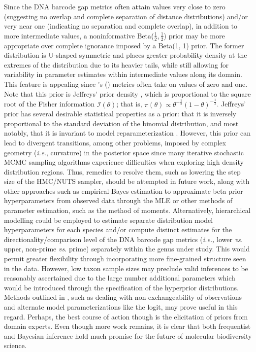 \documentclass[12pt]{article}
\begin{document}
Since the DNA barcode gap metrics often attain values very close to zero (suggesting no overlap and complete separation of distance distributions) and/or very near one (indicating no separation and complete overlap), in addition to more intermediate values, a noninformative Beta($\frac{1}{2}, \frac{1}{2}$) prior may be more appropriate over complete ignorance imposed by a Beta(1, 1) prior. The former distribution is U-shaped symmetric and places greater probability density at the extremes of the distribution due to its heavier tails, while still allowing for variability in parameter estimates within intermediate values along its domain. This feature is appealing since \citeauthor{phillips2024measure}'s (\citeyear{phillips2024measure}) metrics often take on values of zero and one. Note that this prior is Jeffreys' prior density \citep{jeffreys1946invariant}, which is  proportional to the square root of the Fisher information $\mathcal{I}(\theta)$; that is,
$\pi(\theta) \propto \theta^{-\frac{1}{2}}(1-\theta)^{-\frac{1}{2}}$. Jeffreys' prior has several desirable statistical  properties as a prior: that it is inversely proportional to the standard deviation of the binomial distribution, and most notably, that it is invariant to model reparameterization \citep{gelman2014bayesian}. However, this prior can lead to divergent transitions, among other problems, imposed by complex geometry (\textit{i.e.}, curvature) in the posterior space since many iterative stochastic MCMC sampling algorithms experience difficulties when exploring high density distribution regions. Thus, remedies to resolve them, such as lowering the step size of the HMC/NUTS sampler, should be attempted in future work, along with other approaches such as empirical Bayes estimation to approximate beta prior hyperparameters from observed data through the MLE or other methods of parameter estimation, such as the method of moments. Alternatively, hierarchical modelling could be employed to estimate separate distribution model hyperparameters for each species and/or compute distinct estimates for the directionality/comparison level of the DNA barcode gap metrics (\textit{i.e.,} lower \textit{vs.} upper, non-prime \textit{vs.} prime) separately within the genus under study. This would permit greater flexibility through incorporating more fine-grained structure seen in the data. However, low taxon sample sizes may preclude valid inferences to be reasonably ascertained due to the large number additional parameters which would be introduced through the specification of the hyperprior distributions. Methods outlined in \citet{gelman2014bayesian, gelman2020bayesian}, such as dealing with non-exchangeability of observations and alternate model parameterizations like the logit, may prove useful in this regard. Perhaps, the best course of action though is the elicitation of priors from domain experts. Even though more work remains, it is clear that both frequentist and Bayesian inference hold much promise for the future of molecular biodiversity science.
\end{document}
